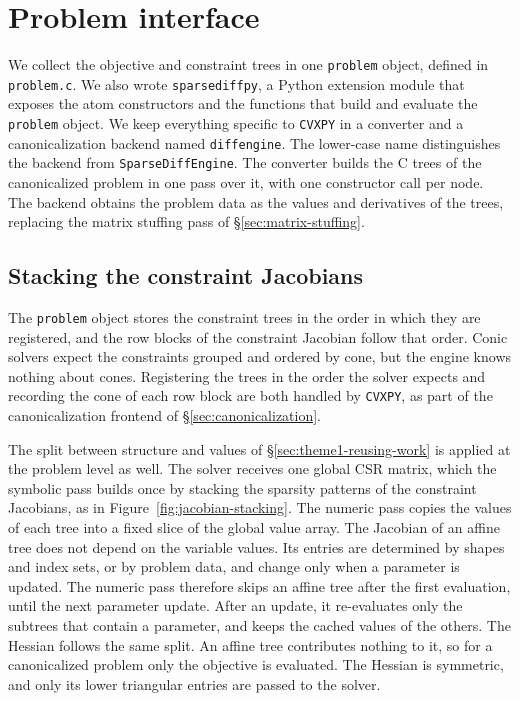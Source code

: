 \section{Problem interface}\label{sec:theme1-api}

We collect the objective and constraint trees in one
\texttt{problem} object, defined in \texttt{problem.c}. We also wrote
\texttt{sparsediffpy}, a Python extension module that exposes the atom constructors and
the functions that build and evaluate the \texttt{problem} object.
We keep everything specific to \texttt{CVXPY} in a converter and a canonicalization
backend named \texttt{diffengine}. The lower-case name distinguishes the backend from
\texttt{SparseDiffEngine}. The converter builds the C trees of the canonicalized
problem in one pass over it, with one constructor call per node. The backend obtains the
problem data as the values and derivatives of the trees, replacing the matrix stuffing
pass of \S\ref{sec:matrix-stuffing}.

\subsection{Stacking the constraint Jacobians}\label{sec:theme1-problem-interface}

The \texttt{problem} object stores the constraint trees in the order in which they are
registered, and the row blocks of the constraint Jacobian follow that order. Conic
solvers expect the constraints grouped and ordered by cone, but the engine knows nothing
about cones. Registering the trees in the order the solver expects and recording the cone
of each row block are both handled by \texttt{CVXPY}, as part of the canonicalization frontend of
\S\ref{sec:canonicalization}.

The split between structure and values of \S\ref{sec:theme1-reusing-work} is applied at
the problem level as well. The solver receives one global CSR matrix, which the symbolic
pass builds once by stacking the sparsity patterns of the constraint Jacobians, as in
Figure~\ref{fig:jacobian-stacking}.
The numeric pass copies the values of each tree into a fixed slice of the global value
array. The Jacobian of an affine tree does not depend on the variable values. Its entries
are determined by shapes and index sets, or by problem data, and change only when a
parameter is updated. The numeric pass therefore skips an affine tree after the first
evaluation, until the next parameter update. After an update, it re-evaluates only the
subtrees that contain a parameter, and keeps the cached values of the others. The Hessian
follows the same split. An affine tree
contributes nothing to it, so for a canonicalized problem only the objective is evaluated.
The Hessian is symmetric, and only its lower triangular entries are passed to the solver.

